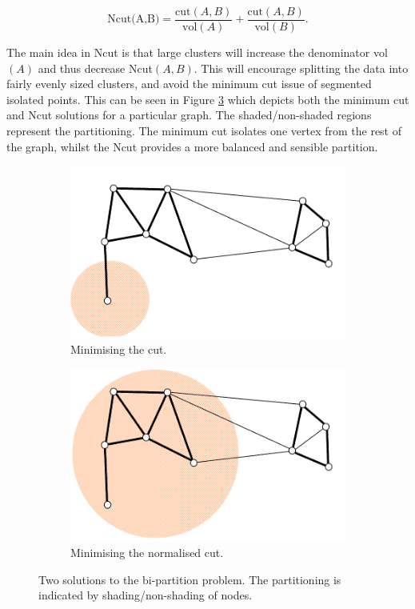 \begin{equation}
  \text{Ncut(A,B)} = \frac{\text{cut}(A, B)}{\text{vol}(A)} + \frac{\text{cut}(A, B)}{\text{vol}(B)}.
    \label{eq:ncut}
\end{equation}

The main idea in Ncut is that large clusters will increase the denominator vol$(A)$ and thus decrease Ncut$(A,B)$. This will encourage splitting the data into fairly evenly sized clusters, and avoid the minimum cut issue of segmented isolated points. This can be seen in Figure \ref{fig:min_norm_cut}  which depicts both the minimum cut and Ncut solutions for a particular graph. The shaded/non-shaded regions represent the partitioning. The minimum cut isolates one vertex from the rest of the graph, whilst the Ncut provides a more balanced and sensible partition. 

\begin{figure}[H]
  \centering
  \begin{subfigure}{0.4\textwidth}
    \centering
    \includegraphics[width = \textwidth]{my_min_cut.png}
    \caption{Minimising the cut.}
  \label{fig:min_cut}
  \end{subfigure}
  \begin{subfigure}{0.4\textwidth}
    \centering
    \includegraphics[width = \textwidth]{my_norm_cut.png}
  \caption{Minimising the normalised cut.}
  \label{fig:norm_cut}
  \end{subfigure}
  \caption{Two solutions to the bi-partition problem. The partitioning is indicated by shading/non-shading of nodes.}
  \label{fig:min_norm_cut}
\end{figure}

